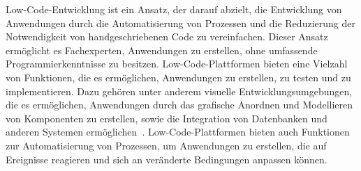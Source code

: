 
Low-Code-Entwicklung ist ein Ansatz, der darauf abzielt, die Entwicklung von Anwendungen 
durch die Automatisierung von Prozessen und die Reduzierung der Notwendigkeit von 
handgeschriebenen Code zu vereinfachen. Dieser Ansatz ermöglicht es Fachexperten, Anwendungen 
zu erstellen, ohne umfassende Programmierkenntnisse zu besitzen. Low-Code-Plattformen 
bieten eine Vielzahl von Funktionen, die es ermöglichen, Anwendungen zu erstellen, zu 
testen und zu implementieren. Dazu gehören unter anderem visuelle Entwicklungsumgebungen, 
die es ermöglichen, Anwendungen durch das grafische Anordnen und Modellieren von Komponenten zu erstellen, 
sowie die Integration von Datenbanken und anderen Systemen ermöglichen~\cite{Bock_2021}. 
Low-Code-Plattformen bieten auch Funktionen zur Automatisierung von Prozessen, um Anwendungen zu 
erstellen, die auf Ereignisse reagieren und sich an veränderte Bedingungen anpassen können.

